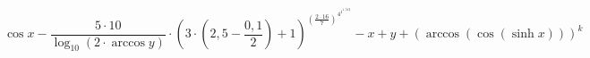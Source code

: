 \documentclass[a4paper]{article}
\begin{document}
$$
\cos{x}-{\frac{5\cdot{10}}{\log_{10}{\left(2\cdot{\arccos{y}}\right)}}\cdot{\left(3\cdot{\left(2,5-{\frac{0,1}{2}}\right)}+{1}\right)^{\left(\frac{2\cdot{16}}{7}\right)^{4^{1^{1,512}}}}}}-{x}+{y}+{\left(\arccos{\left(\cos{\left(\sinh{x}\right)}\right)}\right)^{k}}
$$
\end{document}
